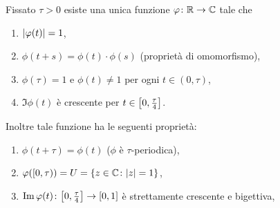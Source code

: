\begin{theorem}
\label{th:omomorfismo_U}
Fissato $\tau>0$ esiste una unica funzione $\varphi\colon {\mathbb R} \to {\mathbb C}$ 
tale che 
\begin{enumerate}
\item ${\left|\varphi(t)\right|}=1$,
\item $\phi(t+s)=\phi(t)\cdot \phi(s)$ (proprietà di omomorfismo),
\item $\phi(\tau) = 1$ e $\phi(t)\neq 1$ per ogni $t\in(0,\tau)$,
\item $\Im\phi(t)$ è crescente per $t\in{\left[ 0,\frac \tau 4 \right]}$.
\end{enumerate}

Inoltre tale funzione ha le seguenti proprietà:
\begin{enumerate}
  \item $\phi(t+\tau)=\phi(t)$ ($\phi$ è $\tau$-periodica),
  \item $\varphi([0,\tau)) = U = {\left\{ z\in {\mathbb C}\colon {\left|z\right|}=1 \right\}}$,
  \item $\operatorname{Im} \varphi(t)\colon {\left[ 0,\frac \tau 4 \right]}\to [0,1]$
  è strettamente crescente e bigettiva,
\end{enumerate}
\end{theorem}
%
